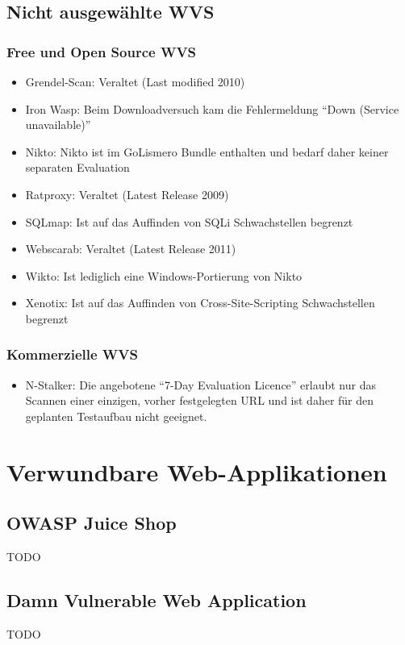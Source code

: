 \documentclass[12pt,oneside,a4paper,parskip]{scrbook}
\begin{document}
  \subsection{Nicht ausgewählte WVS}
    \subsubsection{Free und Open Source WVS}
    \begin{itemize}
      \item Grendel-Scan: Veraltet (Last modified 2010)
      \item Iron Wasp: Beim Downloadversuch kam die Fehlermeldung ``Down (Service unavailable)''
      \item Nikto: Nikto ist im GoLismero Bundle enthalten und bedarf daher keiner separaten Evaluation
      \item Ratproxy: Veraltet (Latest Release 2009)
      \item SQLmap: Ist auf das Auffinden von SQLi Schwachstellen begrenzt
      \item Webscarab: Veraltet (Latest Release 2011)
      \item Wikto: Ist lediglich eine Windows-Portierung von Nikto
      \item Xenotix: Ist auf das Auffinden von Cross-Site-Scripting Schwachstellen begrenzt
    \end{itemize}

    \subsubsection{Kommerzielle WVS}
      \begin{itemize}
        \item N-Stalker: Die angebotene ``7-Day Evaluation Licence'' erlaubt nur das Scannen einer einzigen, vorher festgelegten URL und ist daher für den geplanten Testaufbau nicht geeignet.
      \end{itemize}

\section{Verwundbare Web-Applikationen}
  \subsection{OWASP Juice Shop}
  TODO
  \subsection{Damn Vulnerable Web Application}
  TODO
\end{document}
